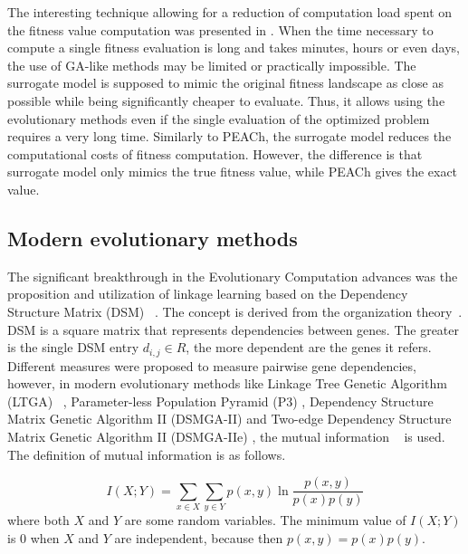 The interesting technique allowing for a reduction of computation load spent on the fitness value computation was presented in \cite{SurrogateModel}. When the time necessary to compute a single fitness evaluation is long and takes minutes, hours or even days, the use of GA-like methods may be limited or practically impossible. The surrogate model is supposed to mimic the original fitness landscape as close as possible while being significantly cheaper to evaluate. Thus, it allows using the evolutionary methods even if the single evaluation of the optimized problem requires a very long time. Similarly to PEACh, the surrogate model reduces the computational costs of fitness computation. However, the difference is that surrogate model only mimics the true fitness value, while PEACh gives the exact value.

\subsection{Modern evolutionary methods}

The significant breakthrough in the Evolutionary Computation advances was the proposition and utilization of linkage learning based on the Dependency Structure Matrix (DSM) ~\cite{dsmga2,P3Original,ltga}. The concept is derived from the organization theory~\cite{dsmga2}. DSM is a square matrix that represents dependencies between genes. The greater is the single DSM entry $d_{i,j}\in R$, the more dependent are the genes it refers. Different measures were proposed to measure pairwise gene dependencies, however, in modern evolutionary methods like Linkage Tree Genetic Algorithm (LTGA) ~\cite{ltga,ltgaOriginal}, Parameter-less Population Pyramid (P3) \cite{P3Original,P3add,P3runtime}, Dependency Structure Matrix Genetic Algorithm II (DSMGA-II) \cite{dsmga2} and Two-edge Dependency Structure Matrix Genetic Algorithm II (DSMGA-IIe) \cite{dsmga2e}, the mutual information ~\cite{dsmga2,mutualInformation} is used. The definition of mutual information is as follows.

\begin{equation}
\label{eq:mutualInformation}
I(X;Y) = \sum_{x \in X} \sum_{y \in Y} p(x,y) \ln{\frac{p(x,y)}{p(x)p(y)}}
\end{equation}
where both $X$ and $Y$ are some random variables. The minimum value of $I(X;Y)$ is $0$ when $X$ and $Y$ are independent, because then $p(x,y) = p(x)p(y)$.

